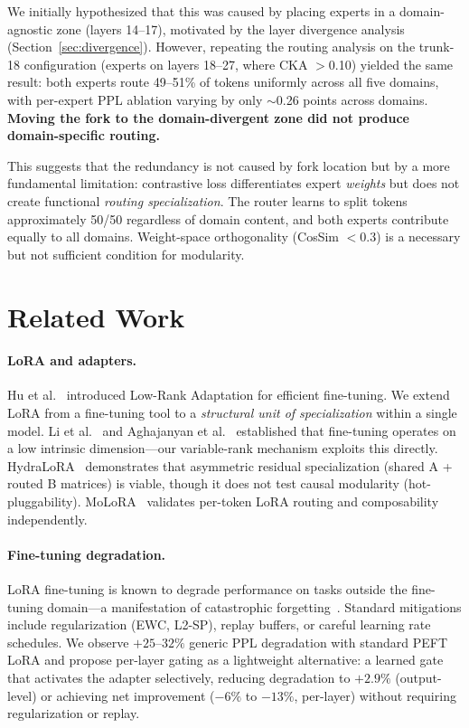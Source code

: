 \documentclass{article}
\begin{document}
We initially hypothesized that this was caused by placing experts in a
domain-agnostic zone (layers 14--17), motivated by the layer divergence
analysis (Section~\ref{sec:divergence}). However, repeating the routing
analysis on the trunk-18 configuration (experts on layers 18--27, where CKA
$>$0.10) yielded the same result: both experts route 49--51\% of tokens
uniformly across all five domains, with per-expert PPL ablation varying by
only $\sim$0.26 points across domains. \textbf{Moving the fork to the
domain-divergent zone did not produce domain-specific routing.}

This suggests that the redundancy is not caused by fork location but by a more
fundamental limitation: contrastive loss differentiates expert \emph{weights}
but does not create functional \emph{routing specialization}. The router
learns to split tokens approximately 50/50 regardless of domain content,
and both experts contribute equally to all domains. Weight-space orthogonality
(CosSim $<$0.3) is a necessary but not sufficient condition for modularity.

\section{Related Work}
\label{sec:related}

\paragraph{LoRA and adapters.}
Hu et al.~\cite{hu2022lora} introduced Low-Rank Adaptation for efficient
fine-tuning. We extend LoRA from a fine-tuning tool to a \emph{structural unit
of specialization} within a single model. Li et al.~\cite{li2018intrinsic}
and Aghajanyan et al.~\cite{aghajanyan2021intrinsic} established that
fine-tuning operates on a low intrinsic dimension---our variable-rank mechanism
exploits this directly. HydraLoRA~\cite{hydralora2024} demonstrates that asymmetric residual
specialization (shared A + routed B matrices) is viable, though it does not
test causal modularity (hot-pluggability). MoLoRA~\cite{molora2026} validates
per-token LoRA routing and composability independently.

\paragraph{Fine-tuning degradation.}
LoRA fine-tuning is known to degrade performance on tasks outside the
fine-tuning domain---a manifestation of catastrophic
forgetting~\cite{biderman2024lora}. Standard mitigations include
regularization (EWC, L2-SP), replay buffers, or careful learning rate
schedules. We observe $+25$--$32\%$ generic PPL degradation with
standard PEFT LoRA and propose per-layer gating as a lightweight
alternative: a learned gate that activates the adapter selectively,
reducing degradation to $+2.9\%$ (output-level) or achieving net
improvement ($-6\%$ to $-13\%$, per-layer) without requiring
regularization or replay.
\end{document}

